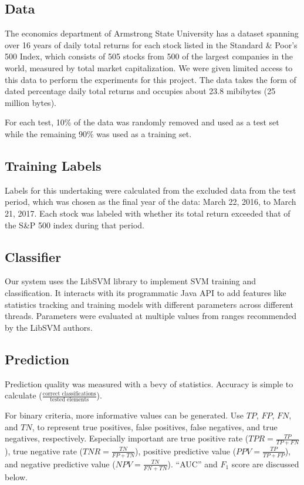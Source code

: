 \documentclass[format=acmlarge]{acmart}
\begin{document}
\subsection{Data}
The economics department of Armstrong State University has a dataset spanning over 16 years of daily total returns for each stock listed in the Standard \& Poor's 500 Index, which consists of 505 stocks from 500 of the largest companies in the world, measured by total market capitalization.  We were given limited access to this data to perform the experiments for this project.  The data takes the form of dated percentage daily total returns and occupies about 23.8 mibibytes (25 million bytes).

For each test, 10\% of the data was randomly removed and used as a test set while the remaining 90\% was used as a training set.

\subsection{Training Labels}
Labels for this undertaking were calculated from the excluded data from the test period, which was chosen as the final year of the data:  March 22, 2016, to March 21, 2017.  Each stock was labeled with whether its total return exceeded that of the S\&P 500 index during that period.

\subsection{Classifier}
Our system uses the LibSVM library to implement SVM training and classification.  It interacts with its programmatic Java API to add features like statistics tracking and training models with different parameters across different threads.  Parameters were evaluated at multiple values from ranges recommended by the LibSVM authors.

\subsection{Prediction}
Prediction quality was measured with a bevy of statistics.  Accuracy is simple to calculate ($\frac{\textrm{correct classifications}}{\textrm{tested elements}}$).

For binary criteria, more informative values can be generated.  Use $\mathit{TP}$, $\mathit{FP}$, $\mathit{FN}$, and $\mathit{TN}$, to represent true positives, false positives, false negatives, and true negatives, respectively.  Especially important are true positive rate ($\mathit{TPR} = \frac{\mathit{TP}}{\mathit{TP} + \mathit{FN}}$), true negative rate ($\mathit{TNR} = \frac{\mathit{TN}}{\mathit{FP} + \mathit{TN}}$), positive predictive value ($\mathit{PPV} = \frac{\mathit{TP}}{\mathit{TP} + \mathit{FP}}$), and negative predictive value ($\mathit{NPV} = \frac{\mathit{TN}}{\mathit{FN} + \mathit{TN}}$).  ``AUC'' and $F_1$ score are discussed below.
\end{document}
